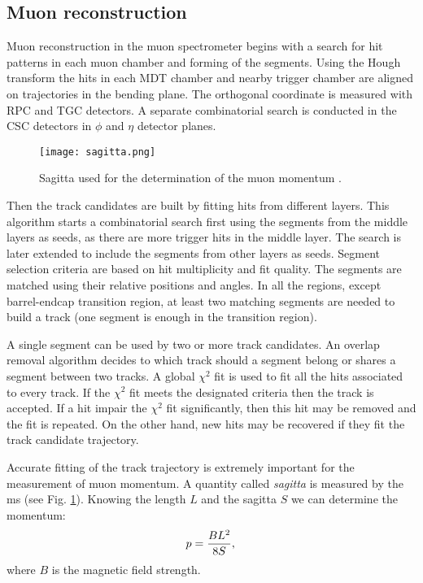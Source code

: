     \subsection{Muon reconstruction}
    Muon reconstruction in the muon spectrometer begins with a search for hit patterns in each muon chamber and forming of the segments. Using the Hough transform \cite{ILLINGWORTH198887} the hits in each MDT chamber and nearby trigger chamber are aligned on trajectories in the bending plane. The orthogonal coordinate is measured with RPC and TGC detectors. A separate combinatorial search is conducted in the CSC detectors in $\phi$ and $\eta$ detector planes.\\
     \begin{figure}[htbp]
    	\centering
    	\texttt{[image: sagitta.png]}
    	\caption[sagitta]{Sagitta used for the determination of the muon momentum \cite{Kaiser:2010zea}.}
    	\label{fig::sagitta}
    \end{figure}
    Then the track candidates are built by fitting hits from different layers. This algorithm starts a combinatorial search first using the segments from the middle layers as seeds, as there are more trigger hits in the middle layer. The search is later extended to include the segments from other layers as seeds. Segment selection criteria are based on hit multiplicity and fit quality. The segments are matched using their relative positions and angles. In all the regions, except barrel-endcap transition region, at least two matching segments are needed to build a track (one segment is enough in the transition region).
    
    A single segment can be used by two or more track candidates. An overlap removal algorithm decides to which track should a segment belong or shares a segment between two tracks. A global $\chi^2$ fit is used to fit all the hits associated to every track. If the $\chi^2$ fit meets the designated criteria then the track is accepted. If a hit impair the $\chi^2$ fit significantly, then this hit may be removed and the fit is repeated. On the other hand, new hits may be recovered if they fit the track candidate trajectory. 
    
    Accurate fitting of the track trajectory is extremely important for the measurement of muon momentum. A quantity called \textit{sagitta} is measured by the \gls{ms} (see Fig. \ref{fig::sagitta}). Knowing the length $L$ and the sagitta $S$ we can determine the momentum:
    	\begin{equation}
    p = \frac{BL^2}{8S},\\
    \end{equation}
    where $B$ is the magnetic field strength.
    
